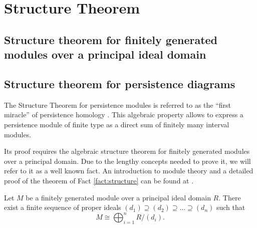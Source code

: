 \chapter{Structure Theorem}
\section{Structure theorem for finitely generated modules over a principal ideal domain}
\section{Structure theorem for persistence diagrams}
The Structure Theorem for persistence modules is referred to as the ``first miracle'' of persistence homology \cite{nanda}. This algebraic property allows to express a persistence module of finite type as a direct sum of finitely many interval modules.

Its proof requires the algebraic structure theorem for finitely generated modules over a principal domain. Due to the lengthy concepts needed to prove it, we will refer to it as a well known fact. An introduction to module theory and a detailed proof of the theorem of Fact \ref{fact:structure} can be found at \cite[Chapter IV]{hungerford}.

\begin{fact} \cite[Chapter IV, Theorem 6.12]{hungerford} \label{fact:structure}
    Let $ M $ be a  finitely generated module over a principal ideal domain $R$. There exist a finite sequence of proper ideals $ (d_1) \supseteq (d_2) \supseteq \dots \supseteq (d_n) $ such that
    $$
        M \cong \bigoplus_{i=1}^n R / (d_i).
    $$
\end{fact}

